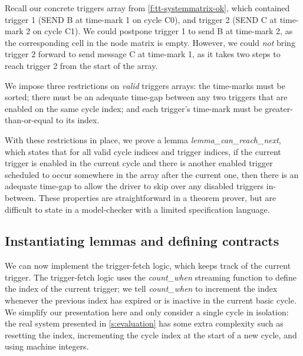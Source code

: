 Recall our concrete triggers array from \autoref{f:tt-systemmatrix-ok}, which contained trigger 1 (SEND B at time-mark 1 on cycle C0), and trigger 2 (SEND C at time-mark 2 on cycle C1).
We could postpone trigger 1 to send B at time-mark 2, as the corresponding cell in the node matrix is empty.
However, we could \emph{not} bring trigger 2 forward to send message C at time-mark 1, as it takes two steps to reach trigger 2 from the start of the array.

We impose three restrictions on \emph{valid} triggers arrays: the time-marks must be sorted; there must be an adequate time-gap between any two triggers that are enabled on the same cycle index; and each trigger's time-mark must be greater-than-or-equal to its index.

With these restrictions in place, we prove a lemma \emph{lemma_can_reach_next}, which states that for all valid cycle indices and trigger indices, if the current trigger is enabled in the current cycle and there is another enabled trigger scheduled to occur somewhere in the array after the current one, then there is an adequate time-gap to allow the driver to skip over any disabled triggers in-between.
These properties are straightforward in a theorem prover, but are difficult to state in a model-checker with a limited specification language.

\subsection{Instantiating lemmas and defining contracts}
\label{s:motivation:contract}

We can now implement the trigger-fetch logic, which keeps track of the current trigger.
The trigger-fetch logic uses the \emph{count_when} streaming function to define the index of the current trigger; we tell \emph{count_when} to increment the index whenever the previous index has expired or is inactive in the current basic cycle.
We simplify our presentation here and only consider a single cycle in isolation: the real system presented in \autoref{s:evaluation} has some extra complexity such as resetting the index, incrementing the cycle index at the start of a new cycle, and using machine integers.

